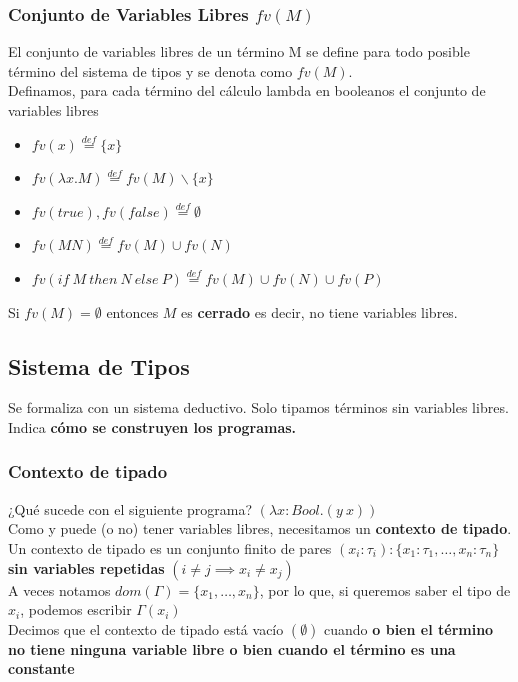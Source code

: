 \documentclass[10pt,a4paper]{article}
\begin{document}
\subsubsection*{Conjunto de Variables Libres $fv(M)$}
El conjunto de variables libres de un término M se define para todo posible término del sistema de tipos y se denota como $fv(M)$. \\
Definamos, para cada término del cálculo lambda en booleanos el conjunto de variables libres
\begin{itemize}
    \item $fv(x) \stackrel{def}{=} \{x\}$
    \item $fv(\lambda x. M) \stackrel{def}{=} fv(M) \backslash \{x\}$
    \item $fv(true), fv(false) \stackrel{def}{=} \emptyset$
    \item $fv(M N) \stackrel{def}{=} fv(M) \cup fv(N)$
    \item $fv(if \ M \ then \ N \ else \ P) \stackrel{def}{=} fv(M) \cup fv(N) \cup fv(P)$
\end{itemize}
Si $fv(M) = \emptyset$ entonces $M$ es \textbf{cerrado} es decir, no tiene variables libres.
\subsection*{Sistema de Tipos}
Se formaliza con un sistema deductivo. Solo tipamos términos sin variables libres. Indica \textbf{cómo se construyen los programas.}
\subsubsection*{Contexto de tipado}
¿Qué sucede con el siguiente programa? $(\lambda x:Bool. (y \ x))$ \\
Como y puede (o no) tener variables libres, necesitamos un \textbf{contexto de tipado}.\\
Un contexto de tipado es un conjunto finito de pares $(x_{i}:\tau_{i}): \{x_{1}:\tau_{1}, \dots, x_{n}:\tau_{n}\}$ \textbf{sin variables repetidas} $(i \neq j \implies x_{i} \neq x_{j})$ \\
A veces notamos $dom(\Gamma) = \{x_{1}, \dots, x_{n}\}$, por lo que, si queremos saber el tipo de $x_{i}$, podemos escribir $\Gamma(x_{i})$ \\
Decimos que el contexto de tipado está vacío $(\emptyset)$ cuando \textbf{o bien el término no tiene ninguna variable libre o bien cuando el término es una constante}
\end{document}
